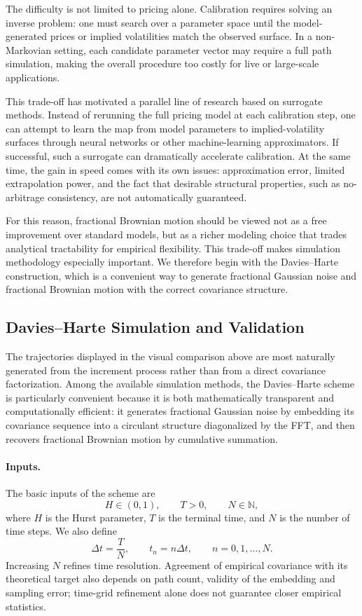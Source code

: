 The difficulty is not limited to pricing alone. Calibration requires solving an inverse problem: one must search over a parameter space until the model-generated prices or implied volatilities match the observed surface. In a non-Markovian setting, each candidate parameter vector may require a full path simulation, making the overall procedure too costly for live or large-scale applications.

This trade-off has motivated a parallel line of research based on surrogate methods. Instead of rerunning the full pricing model at each calibration step, one can attempt to learn the map from model parameters to implied-volatility surfaces through neural networks or other machine-learning approximators. If successful, such a surrogate can dramatically accelerate calibration. At the same time, the gain in speed comes with its own issues: approximation error, limited extrapolation power, and the fact that desirable structural properties, such as no-arbitrage consistency, are not automatically guaranteed.

For this reason, fractional Brownian motion should be viewed not as a free improvement over standard models, but as a richer modeling choice that trades analytical tractability for empirical flexibility. This trade-off makes simulation methodology especially important. We therefore begin with the Davies--Harte construction, which is a convenient way to generate fractional Gaussian noise and fractional Brownian motion with the correct covariance structure.

\subsection{Davies--Harte Simulation and Validation}

The trajectories displayed in the visual comparison above are most naturally generated from the increment process rather than from a direct covariance factorization. Among the available simulation methods, the Davies--Harte scheme is particularly convenient because it is both mathematically transparent and computationally efficient: it generates fractional Gaussian noise by embedding its covariance sequence into a circulant structure diagonalized by the FFT, and then recovers fractional Brownian motion by cumulative summation.

\paragraph{Inputs.} The basic inputs of the scheme are
\[
H\in(0,1), \qquad T>0, \qquad N\in\mathbb{N},
\]
where \(H\) is the Hurst parameter, \(T\) is the terminal time, and \(N\) is the number of time steps. We also define
\[
\Delta t = \frac{T}{N},
\qquad
t_n = n\Delta t,
\qquad n=0,1,\dots,N.
\]
Increasing \(N\) refines time resolution. Agreement of empirical covariance with its theoretical target also depends on path count, validity of the embedding and sampling error; time-grid refinement alone does not guarantee closer empirical statistics.

